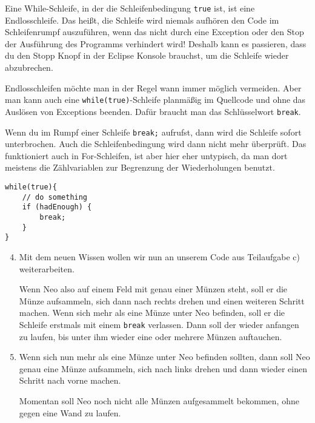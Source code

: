 \begin{Infobox}
	Eine While-Schleife, in der die Schleifenbedingung \lstinline{true} ist, ist eine Endlosschleife.
	Das heißt, die Schleife wird niemals aufhören den Code im Schleifenrumpf auszuführen, wenn das nicht durch eine Exception oder den Stop der Ausführung des Programms verhindert wird!
	Deshalb kann es passieren, dass du den Stopp Knopf in der Eclipse Konsole brauchst, um die Schleife wieder abzubrechen.

	Endlosschleifen möchte man in der Regel wann immer möglich vermeiden.
	Aber man kann auch eine \lstinline{while(true)}-Schleife planmäßig im Quellcode und ohne das Auslösen von Exceptions beenden.
	Dafür braucht man das Schlüsselwort \lstinline{break}.

	Wenn du im Rumpf einer Schleife \lstinline{break;} aufrufst, dann wird die Schleife sofort unterbrochen.
	Auch die Schleifenbedingung wird dann nicht mehr überprüft.
	Das funktioniert auch in For-Schleifen, ist aber hier eher untypisch, da man dort meistens die Zählvariablen zur Begrenzung der Wiederholungen benutzt.

	\begin{lstlisting}[numbers=none]
while(true){
    // do something
    if (hadEnough) {
        break;
    }
}
	\end{lstlisting}

\end{Infobox}


\begin{enumerate}\setcounter{enumi}{3}
	\item
		Mit dem neuen Wissen wollen wir nun an unserem Code aus Teilaufgabe c) weiterarbeiten.

		Wenn Neo also auf einem Feld mit genau einer Münzen steht, soll er die Münze aufsammeln, sich dann nach rechts drehen und einen weiteren Schritt machen.
		Wenn sich mehr als eine Münze unter Neo befinden, soll er die Schleife erstmals mit einem \lstinline{break} verlassen.
		Dann soll der wieder anfangen zu laufen, bis unter ihm wieder eine oder mehrere Münzen auftauchen.

	\item
		Wenn sich nun mehr als eine Münze unter Neo befinden sollten, dann soll Neo genau eine Münze aufsammeln, sich nach links drehen und dann wieder einen Schritt nach vorne machen.

		Momentan soll Neo noch nicht alle Münzen aufgesammelt bekommen, ohne gegen eine Wand zu laufen.
\end{enumerate}


